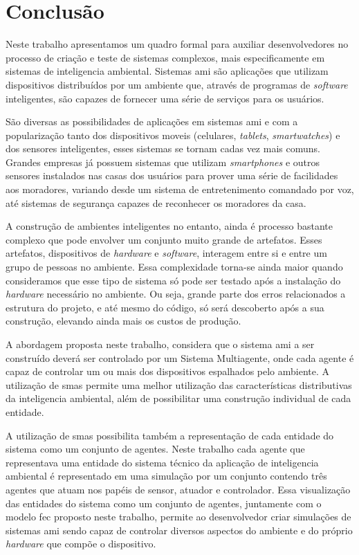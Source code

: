 \chapter{Conclusão}
\label{chap:conclusao}

    Neste trabalho apresentamos um quadro formal para auxiliar desenvolvedores no processo de criação e teste de sistemas complexos, mais especificamente em sistemas de inteligencia ambiental. Sistemas \acrshort{ami} são aplicações que utilizam dispositivos distribuídos por um ambiente que, através de programas de \textit{software} inteligentes, são capazes de fornecer uma série de serviços para os usuários. 
    
    São diversas as possibilidades de aplicações em sistemas \acrshort{ami} e com a popularização tanto dos dispositivos moveis (celulares, \textit{tablets}, \textit{smartwatches}) e dos sensores inteligentes, esses sistemas se tornam cadas vez mais comuns. Grandes empresas já possuem sistemas que utilizam \textit{smartphones} e outros sensores instalados nas casas dos usuários para prover uma série de facilidades aos moradores, variando desde um sistema de entretenimento comandado por voz, até sistemas de segurança capazes de reconhecer os moradores da casa. 
    
    A construção de ambientes inteligentes no entanto, ainda é processo bastante complexo que pode envolver um conjunto muito grande de artefatos. Esses artefatos, dispositivos de \textit{hardware} e \textit{software}, interagem entre si e entre um grupo de pessoas no ambiente. Essa complexidade torna-se ainda maior quando consideramos que esse tipo de sistema só pode ser testado após a instalação do \textit{hardware} necessário no ambiente. Ou seja, grande parte dos erros relacionados a estrutura do projeto, e até mesmo do código, só será descoberto após a sua construção, elevando ainda mais os custos de produção. 
    
    A abordagem proposta neste trabalho, considera que o sistema \acrshort{ami} a ser construído deverá ser controlado por um Sistema Multiagente, onde cada agente é capaz de controlar um ou mais dos dispositivos espalhados pelo ambiente. A utilização de \acrshort{sma}s permite uma melhor utilização das características distributivas da inteligencia ambiental, além de possibilitar uma construção individual de cada entidade. 
    
    A utilização de \acrshort{sma}s possibilita  também a representação de cada entidade do sistema como um conjunto de agentes. Neste trabalho cada agente que representava uma entidade do sistema técnico da aplicação de inteligencia ambiental é representado em uma simulação por um conjunto contendo três agentes que atuam nos papéis de sensor, atuador e controlador. Essa visualização das entidades do sistema como um conjunto de agentes, juntamente com o modelo \acrshort{fec} proposto neste trabalho, permite ao desenvolvedor criar simulações de sistemas \acrshort{ami} sendo capaz de controlar diversos aspectos do ambiente e do próprio \textit{hardware} que compõe o dispositivo.
    

